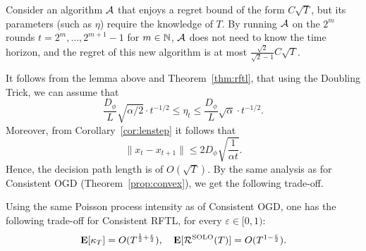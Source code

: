 \begin{lemma}
    Consider an algorithm $\mathcal{A}$ that enjoys a regret bound of the form $C\sqrt{T}$, but its parameters (such as $\eta$) require the knowledge of $T$. By running $\mathcal{A}$ on the $2^m$ rounds $t = 2^m,\ldots,2^{m+1} -1$ for $m\in \mathbb{N}$, $\mathcal{A}$ does not need to know the time horizon, and the regret of this new algorithm is at most $\frac{\sqrt{2}}{\sqrt{2} - 1}C\sqrt{T}$.
\end{lemma}

It follows from the lemma above and Theorem~\ref{thm:rftl}, that using the Doubling Trick, we can assume that 
\[
    \frac{D_\phi}{L} \sqrt{\alpha/2}\cdot t^{-1/2} \leq \eta_t \leq \frac{D_\phi}{L} \sqrt{\alpha} \cdot t^{-1/2}.
\]
Moreover, from Corollary~\ref{cor:lenstep} it follows that 
\[
    \|x_t - x_{t+1}\| \leq  2D_\phi \sqrt{\frac{1}{\alpha t}}.
\]
Hence, the decision path length is of $O(\sqrt{T})$. By the same analysis as for Consistent OGD (Theorem~\ref{prop:convex}), we get the following trade-off.
\begin{theorem}
    Using the same Poisson process intensity as of Consistent OGD, one has the following trade-off for Consistent RFTL, for every $\varepsilon \in [0, 1)$:
   \[
      \mathbf{E}[\kappa_T] = O(T^{\frac{1}{2}+\frac{\varepsilon}{2}}),\quad \mathbf{E}[\mathcal{R}^{\mathrm{SOLO}}(T)] = O(T^{1-\frac{\varepsilon}{2}}).
   \]
 
\end{theorem}


